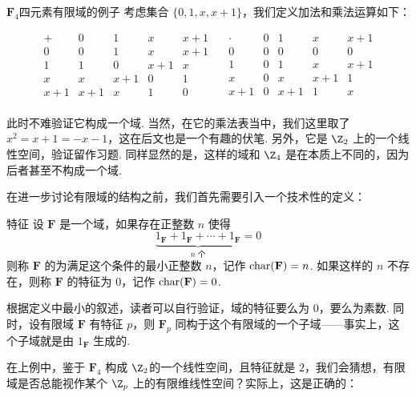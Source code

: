 \begin{example}{$\mathbf{F}_4$}{四元素有限域的例子}
    考虑集合 $\{0, 1, x, x + 1\}$，我们定义加法和乘法运算如下：

    \[
    \begin{array}{c|cccc}
        + & 0 & 1 & x & x + 1 \\
        \hline
        0 & 0 & 1 & x & x + 1 \\
        1 & 1 & 0 & x + 1 & x \\
        x & x & x + 1 & 0 & 1 \\
        x + 1 & x + 1 & x & 1 & 0 \\
    \end{array}
    \quad
    \begin{array}{c|cccc}
        \cdot & 0 & 1 & x & x + 1 \\
        \hline
        0 & 0 & 0 & 0 & 0 \\
        1 & 0 & 1 & x & x + 1 \\
        x & 0 & x & x + 1 & 1 \\
        x + 1 & 0 & x + 1 & 1 & x \\
    \end{array}
    \]

    此时不难验证它构成一个域. 当然，在它的乘法表当中，我们这里取了 $x^2 = x + 1 = -x - 1$，这在后文也是一个有趣的伏笔. 另外，它是 $\Z_2$ 上的一个线性空间，验证留作习题. 同样显然的是，这样的域和 $\Z_4$ 是在本质上不同的，因为后者甚至不构成一个域.
\end{example}

在进一步讨论有限域的结构之前，我们首先需要引入一个技术性的定义：

\begin{definition}{特征}{}
    设 $\mathbf{F}$ 是一个域，如果存在正整数 $n$ 使得
    \[
        \underbrace{1_\mathbf{F} + 1_\mathbf{F} + \cdots + 1_\mathbf{F}}_{n \text{ 个}} = 0
    \]
    则称 $\mathbf{F}$ 的为满足这个条件的最小正整数 $n$，记作 $\operatorname{char}(\mathbf{F}) = n$. 如果这样的 $n$ 不存在，则称 $\mathbf{F}$ 的特征为 $0$，记作 $\operatorname{char}(\mathbf{F}) = 0$.
\end{definition}

根据定义中最小的叙述，读者可以自行验证，域的特征要么为 $0$，要么为素数. 同时，设有限域 $\mathbf{F}$ 有特征 $p$，则 $\mathbf{F}_p$ 同构于这个有限域的一个子域——事实上，这个子域就是由 $1_\mathbf{F}$ 生成的.

在上例中，鉴于 $\mathbf{F}_4$ 构成 $\Z_2$的一个线性空间，且特征就是 $2$，我们会猜想，有限域是否总能视作某个 $\Z_p$ 上的有限维线性空间？实际上，这是正确的：


